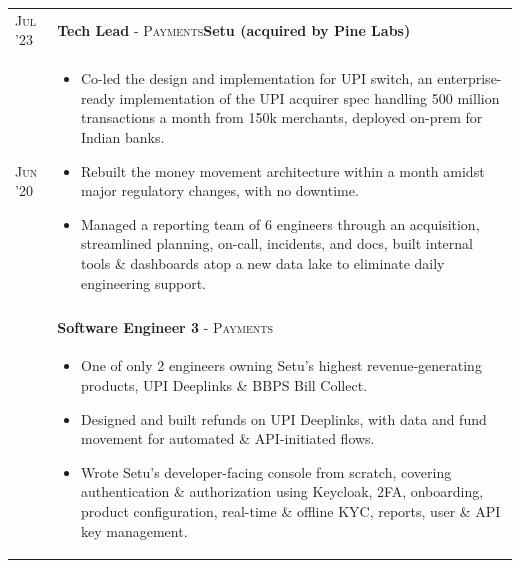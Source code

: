 \documentclass[a4paper,10pt]{extarticle} %
\begin{document}
\begin{tabularx}{\linewidth}{l | X}
\textsc{Jul '23} & \textbf{Tech Lead} \textsc{- Payments}\hfill\raisebox{-.2\height}{ \hspace{0.3em}}\textbf{Setu (acquired by Pine Labs)}\\
\textsc{Jun '20} & \begin{itemize}[leftmargin=*, nosep, before=\vspace{-1.0\baselineskip}, after=\vspace{-1.6\baselineskip}]
  \item Co-led the design and implementation for UPI switch, an enterprise-ready implementation of the UPI acquirer spec handling 500 million transactions a month from 150k merchants, deployed on-prem for Indian banks.
  \item Rebuilt the money movement architecture within a month amidst major regulatory changes, with no downtime.
  \item Managed a reporting team of 6 engineers through an acquisition, streamlined planning, on-call, incidents, and docs, built internal tools \& dashboards atop a new data lake to eliminate daily engineering support.
\end{itemize}\\\\
& \textbf{Software Engineer 3} \textsc{- Payments}\\
& \begin{itemize}[leftmargin=*, nosep, before=\vspace{-1.0\baselineskip}, after=\vspace{-1.0\baselineskip}]
  \item One of only 2 engineers owning Setu's highest revenue-generating products, UPI Deeplinks \& BBPS Bill Collect.
  \item Designed and built refunds on UPI Deeplinks, with data and fund movement for automated \& API-initiated flows.
  \item Wrote Setu's developer-facing console from scratch, covering authentication \& authorization using Keycloak, 2FA, onboarding, product configuration, real-time \& offline KYC, reports, user \& API key management.

\end{itemize}
\end{tabularx}
\end{document}
